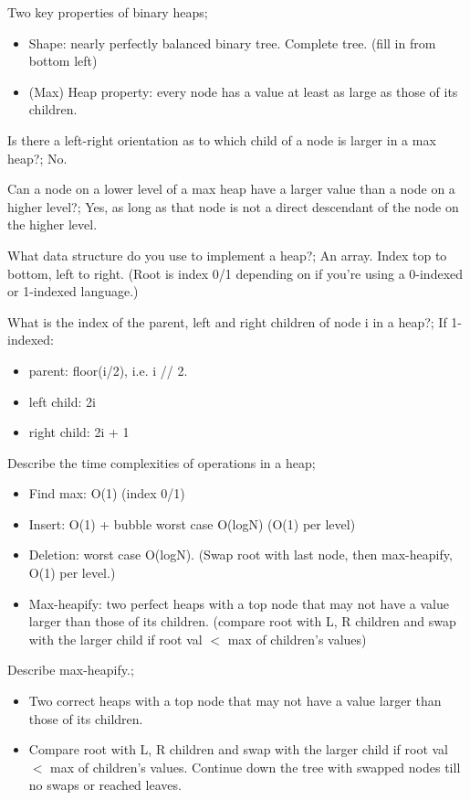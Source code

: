 \documentclass{article}
\begin{document}
Two key properties of binary heaps; \begin{itemize} \item Shape: nearly perfectly balanced binary tree. Complete tree. (fill in from bottom left) \item (Max) Heap property: every node has a value at least as large as those of its children.  \end{itemize}

Is there a left-right orientation as to which child of a node is larger in a max heap?; No.

Can a node on a lower level of a max heap have a larger value than a node on a higher level?; Yes, as long as that node is not a direct descendant of the node on the higher level.

What data structure do you use to implement a heap?; An array. Index top to bottom, left to right. (Root is index 0/1 depending on if you're using a 0-indexed or 1-indexed language.)

What is the index of the parent, left and right children of node i in a heap?; If 1-indexed: \begin{itemize} \item parent: floor(i/2), i.e. i // 2.  \item left child: 2i \item right child: 2i + 1 \end{itemize}

Describe the time complexities of operations in a heap; \begin{itemize} \item Find max: O(1) (index 0/1) \item Insert: O(1) + bubble worst case O(logN) (O(1) per level) \item Deletion: worst case O(logN). (Swap root with last node, then max-heapify, O(1) per level.) \item Max-heapify: two perfect heaps with a top node that may not have a value larger than those of its children. (compare root with L, R children and swap with the larger child if root val $<$ max of children's values) \end{itemize}

Describe max-heapify.; \begin{itemize} \item Two correct heaps with a top node that may not have a value larger than those of its children.  \item Compare root with L, R children and swap with the larger child if root val $<$ max of children's values. Continue down the tree with swapped nodes till no swaps or reached leaves.  \end{itemize} 
\end{document}
